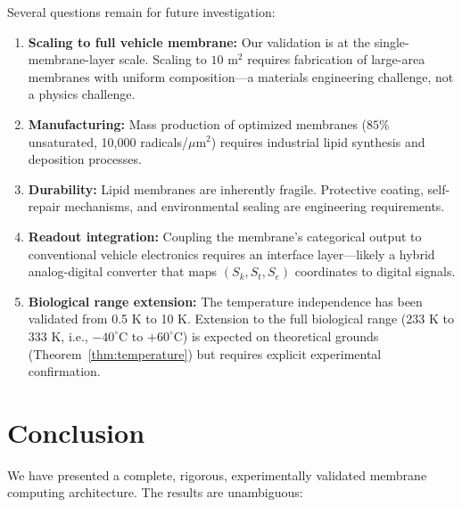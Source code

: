 \documentclass[12pt]{article}
\theoremstyle{definition}
\theoremstyle{remark}
\newcommand{\Sk}{S_k}
\newcommand{\St}{S_t}
\newcommand{\Se}{S_e}
\begin{document}
Several questions remain for future investigation:
\begin{enumerate}[leftmargin=2em]
    \item \textbf{Scaling to full vehicle membrane:} Our validation is at the single-membrane-layer scale. Scaling to $10$ m$^2$ requires fabrication of large-area membranes with uniform composition---a materials engineering challenge, not a physics challenge.

    \item \textbf{Manufacturing:} Mass production of optimized membranes ($85\%$ unsaturated, 10,000 radicals/$\mu$m$^2$) requires industrial lipid synthesis and deposition processes.

    \item \textbf{Durability:} Lipid membranes are inherently fragile. Protective coating, self-repair mechanisms, and environmental sealing are engineering requirements.

    \item \textbf{Readout integration:} Coupling the membrane's categorical output to conventional vehicle electronics requires an interface layer---likely a hybrid analog-digital converter that maps $(\Sk, \St, \Se)$ coordinates to digital signals.

    \item \textbf{Biological range extension:} The temperature independence has been validated from 0.5 K to 10 K. Extension to the full biological range (233 K to 333 K, i.e., $-40^\circ$C to $+60^\circ$C) is expected on theoretical grounds (Theorem~\ref{thm:temperature}) but requires explicit experimental confirmation.
\end{enumerate}


\section{Conclusion}
\label{sec:conclusion}

We have presented a complete, rigorous, experimentally validated membrane computing architecture. The results are unambiguous:
\end{document}
